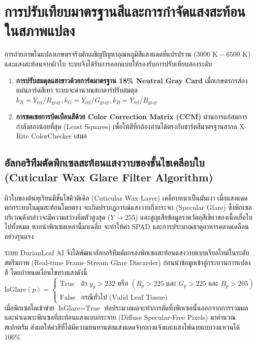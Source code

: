 \section{การปรับเทียบมาตรฐานสีและการกำจัดแสงสะท้อนในสภาพแปลง}
การถ่ายภาพในแปลงเกษตรจริงมักเผชิญปัญหาอุณหภูมิสีแสงแดดที่แปรปรวน ($3000\text{ K} - 6500\text{ K}$) และแสงสะท้อนจากผิวใบ ระบบจึงได้รับการออกแบบให้รองรับการปรับเทียบสองระดับ
\begin{enumerate}
  \item \textbf{การปรับสมดุลแสงขาวด้วยการ์ดมาตรฐาน 18\% Neutral Gray Card} เมื่อเกษตรกรส่องแผ่นการ์ดสีเทา ระบบจะคำนวณสเกลาร์ปรับสมดุล $k_R = Y_{\text{ref}} / R_{\text{gray}}, k_G = Y_{\text{ref}} / G_{\text{gray}}, k_B = Y_{\text{ref}} / B_{\text{gray}}$
  \item \textbf{การชดเชยการบิดเบือนสีด้วย Color Correction Matrix (CCM)} ผ่านการแก้สมการกำลังสองน้อยที่สุด (Least Squares) เพื่อให้สีที่กล้องอ่านได้ตรงกับชาร์ตสีมาตรฐานสากล X-Rite ColorChecker เสมอ
\end{enumerate}

\subsection{อัลกอริทึมตัดพิกเซลสะท้อนแสงวาบของชั้นไขเคลือบใบ (Cuticular Wax Glare Filter Algorithm)}
ผิวใบของต้นทุเรียนมีชั้นไขคิวติเคิล (Cuticular Wax Layer) เคลือบหนาเป็นมันเงา เมื่อแสงแดดตกกระทบในมุมสะท้อนโดยตรง จะเกิดปรากฏการณ์แสงวาบกึ่งกระจก (Specular Glare) ซึ่งพิกเซลบริเวณดังกล่าวจะมีความสว่างอิ่มตัวสูงสุด ($Y \to 255$) และสูญเสียข้อมูลรงควัตถุสีเขียวของเนื้อเยื่อใบไปทั้งหมด หากนำพิกเซลเหล่านี้มาเฉลี่ย จะทำให้ค่า SPAD และการประมาณธาตุอาหารคลาดเคลื่อนอย่างรุนแรง

ระบบ DurianLeaf AI จึงได้พัฒนาอัลกอริทึมคัดกรองพิกเซลสะท้อนแสงวาบแบบเรียลไทม์ในระดับสตรีมภาพ (Real-time Frame Stream Glare Discarder) ก่อนนำข้อมูลเข้าสู่กระบวนการแปลงสี โดยกำหนดเงื่อนไขทางแสงดังนี้
\begin{equation}
  \text{IsGlare}(p) = \begin{cases}
    \text{True} & \text{ถ้า } y_p > 232 \text{ หรือ } (R_p > 225 \text{ และ } G_p > 225 \text{ และ } B_p > 205) \\
    \text{False} & \text{กรณีทั่วไป (Valid Leaf Tissue)}
  \end{cases}
\end{equation}
เมื่อพิกเซลใดเข้าข่าย $\text{IsGlare} = \text{True}$ ท่อประมวลผลจะทำการตัดทิ้งพิกเซลนั้นออกจากการรวมผล และนำเฉพาะพิกเซลที่สะท้อนแสงแบบกระจาย (Diffuse Specular-Free Pixels) มาคำนวณสเปกตรัม ส่งผลให้ค่าสีที่ได้มีความทนทานต่อแสงแดดจ้ากลางแจ้งและแสงไฟฉายแบบวงแหวนได้ $100\%$

